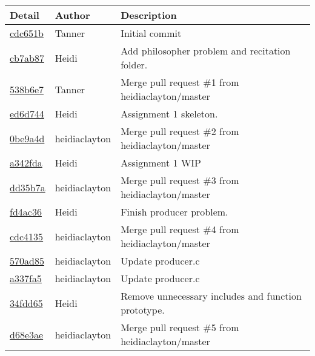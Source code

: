 \documentclass{article}
\begin{document}
\begin{tabular}{l l l}\textbf{Detail} & \textbf{Author} & \textbf{Description}\\\hline
	\href{https://github.com/TFry/cs444group1/commit/cdc651bc4b8ba45b06f74db037861af15b474f27}{cdc651b} & Tanner & Initial commit\\\hline
	\href{https://github.com/TFry/cs444group1/commit/cb7ab8708f9e44b8d202ec5f31d6c197004bd27f}{cb7ab87} & Heidi & Add philosopher problem and recitation folder.\\\hline
	\href{https://github.com/TFry/cs444group1/commit/538b6e77e7635c2b6fd9a6c3b8e4c09f50921ccd}{538b6e7} & Tanner & Merge pull request \#1 from heidiaclayton/master\\\hline
	\href{https://github.com/TFry/cs444group1/commit/ed6d744275ec587699c9d0830a1bfa5dce6bbbf5}{ed6d744} & Heidi & Assignment 1 skeleton.\\\hline
	\href{https://github.com/TFry/cs444group1/commit/0be9a4d21ca938bd1eb5ef78fe7c9e46b8718630}{0be9a4d} & heidiaclayton & Merge pull request \#2 from heidiaclayton/master\\\hline
	\href{https://github.com/TFry/cs444group1/commit/a342fda38762b9a6df9273870c1f502b429e5160}{a342fda} & Heidi & Assignment 1 WIP\\\hline
	\href{https://github.com/TFry/cs444group1/commit/dd35b7a5dc7006691dab998cad98e3042cac04dc}{dd35b7a} & heidiaclayton & Merge pull request \#3 from heidiaclayton/master\\\hline
	\href{https://github.com/TFry/cs444group1/commit/fd4ac367a5425a013e711d918fc12b11e055f353}{fd4ac36} & Heidi & Finish producer problem.\\\hline
	\href{https://github.com/TFry/cs444group1/commit/cdc4135f68d1931fff4c16ef7c28a1f5fc871556}{cdc4135} & heidiaclayton & Merge pull request \#4 from heidiaclayton/master\\\hline
	\href{https://github.com/TFry/cs444group1/commit/570ad855dd81493a1a123a3079c62b8f6d353ce6}{570ad85} & heidiaclayton & Update producer.c\\\hline
	\href{https://github.com/TFry/cs444group1/commit/a337fa56dbcbd2403bd03ef91cdc6c239c4ca27b}{a337fa5} & heidiaclayton & Update producer.c\\\hline
	\href{https://github.com/TFry/cs444group1/commit/34fdd655d953e532763ac4de4d0f164fa68f3a18}{34fdd65} & Heidi & Remove unnecessary includes and function prototype.\\\hline
	\href{https://github.com/TFry/cs444group1/commit/d68e3ae8e9144df387fc89141f08662dc6d766e7}{d68e3ae} & heidiaclayton & Merge pull request \#5 from heidiaclayton/master\\\hline\end{tabular}
\end{document}
